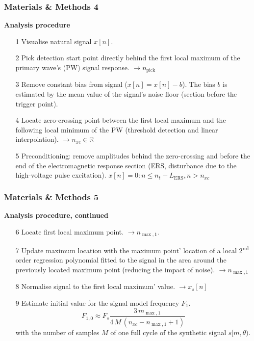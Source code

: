 	\begin{frame}
		\frametitle{Materials \& Methods 4}
		\textcolor{RIPtitlecol}{\textbf{Analysis procedure}}
		\begin{enumerate}
			\setlength\itemsep{0.5em}
			\item[1] Visualise natural signal $x[n]$.
			\item[2] Pick detection start point directly behind the first local maximum of the primary wave's (PW) signal response. $\rightarrow n_{\text{pick}}$
			\item[3] Remove constant bias from signal ($x[n] = x[n] - b$). The bias $b$ is estimated by the mean value of the signal's noise floor (section before the trigger point).
			\item[4] Locate zero-crossing point between the first local maximum and the following local minimum of the PW (threshold detection and linear interpolation). $\rightarrow n_{xc} \in \mathbb{R}$
			\item[5] Preconditioning: remove amplitudes behind the zero-crossing and before the end of the electromagnetic response section (ERS, disturbance due to the high-voltage pulse excitation). $x[n] = 0: n \leq n_t + L_{\text{ERS}}, n > n_{xc}$
		\end{enumerate}
	\end{frame}

	\begin{frame}
		\frametitle{Materials \& Methods 5}
		\textcolor{RIPtitlecol}{\textbf{Analysis procedure, continued \textellipsis{}}}
		\begin{enumerate}
			\setlength\itemsep{0.5em}
			\item[6] Locate first local maximum point. $\rightarrow n_{\max,1}$.
			\item[7] Update maximum location with the maximum point' location of a local 2\textsuperscript{nd} order regression polynomial fitted to the signal in the area around the previously located maximum point (reducing the impact of noise). $\rightarrow n_{\max,1}$
			\item[8] Normalise signal to the first local maximum' value. $\rightarrow x_s[n]$
			\item[9] Estimate initial value for the signal model frequency $F_1$.
			\begin{equation*}
				F_{1,0} \approx F_s \frac{3 \, m_{\max,1}}{4 \, M \, (n_{xc} - n_{\max,1} + 1)}
			\end{equation*}
			with the number of samples $M$ of one full cycle of the synthetic signal $s[m,\theta)$.
		\end{enumerate}
	\end{frame}

